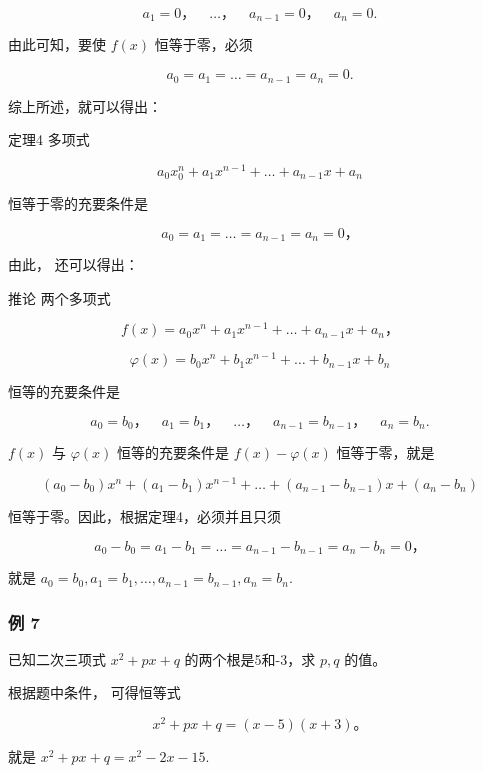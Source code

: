 \[
a _ {1} = 0\text{，} \quad \dots \text{，} \quad a _ {n - 1} = 0\text{，} \quad a _ {n} = 0.
\]

由此可知，要使 \(f(x)\) 恒等于零，必须

\[
a _ {0} = a _ {1} = \dots = a _ {n - 1} = a _ {n} = 0.
\]

综上所述，就可以得出：

定理4 多项式

\[
a _ {0} x _ {0} ^ {n} + a _ {1} x ^ {n - 1} + \dots + a _ {n - 1} x + a _ {n}
\]

恒等于零的充要条件是

\[
a _ {0} = a _ {1} = \dots = a _ {n - 1} = a _ {n} = 0\text{，}
\]

由此， 还可以得出：

推论 两个多项式

\[
f (x) = a _ {0} x ^ {n} + a _ {1} x ^ {n - 1} + \dots + a _ {n - 1} x + a _ {n}\text{，}
\]

\[
\varphi (x) = b _ {0} x ^ {n} + b _ {1} x ^ {n - 1} + \dots + b _ {n - 1} x + b _ {n}
\]

恒等的充要条件是

\[
a _ {0} = b _ {0}\text{，} \quad a _ {1} = b _ {1}\text{，} \quad \dots \text{，} \quad a _ {n - 1} = b _ {n - 1}\text{，} \quad a _ {n} = b _ {n}.
\]

 \(f(x)\) 与 \(\varphi (x)\) 恒等的充要条件是
\(f(x) - \varphi (x)\) 恒等于零，就是

\[
(a _ {0} - b _ {0}) x ^ {n} + (a _ {1} - b _ {1}) x ^ {n - 1} + \dots + (a _ {n - 1} - b _ {n - 1}) x + (a _ {n} - b _ {n})
\]

恒等于零。因此，根据定理4，必须并且只须

\[
a _ {0} - b _ {0} = a _ {1} - b _ {1} = \dots = a _ {n - 1} - b _ {n - 1} = a _ {n} - b _ {n} = 0\text{，}
\]

就是 \(a_0 = b_0, a_1 = b_1, \dots, a_{n-1} = b_{n-1}, a_n = b_n.\)

\subsubsection{例 7}

已知二次三项式 \(x^{2} + px + q\) 的两个根是5和-3，求 \(p, q\) 的值。

 根据题中条件， 可得恒等式

\[
x ^ {2} + p x + q = (x - 5) (x + 3)\text{。}
\]

就是 \(x^{2} + px + q = x^{2} - 2x - 15.\)

